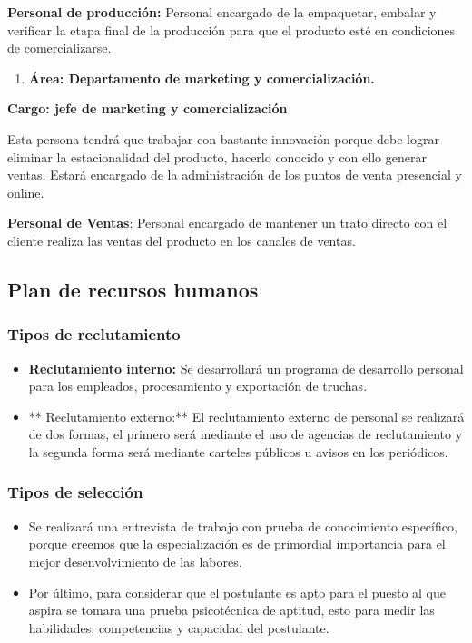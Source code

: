 \documentclass[
  stu,
  floatsintext,
  longtable,
  a4paper,
  nolmodern,
  notxfonts,
  notimes,
  12pt,
  colorlinks=true,linkcolor=blue,citecolor=blue,urlcolor=blue]{apa7}
\providecommand{\tightlist}{%
  \setlength{\itemsep}{0pt}\setlength{\parskip}{0pt}}
\begin{document}
\textbf{Personal de producción:} Personal encargado de la empaquetar,
embalar y verificar la etapa final de la producción para que el producto
esté en condiciones de comercializarse.

\begin{enumerate}
\def\labelenumi{\alph{enumi})}
\setcounter{enumi}{3}
\tightlist
\item
  \textbf{Área: Departamento de marketing y comercialización.}
\end{enumerate}

\textbf{Cargo: jefe de marketing y comercialización}

Esta persona tendrá que trabajar con bastante innovación porque debe
lograr eliminar la estacionalidad del producto, hacerlo conocido y con
ello generar ventas. Estará encargado de la administración de los puntos
de venta presencial y online.

\textbf{Personal de Ventas}: Personal encargado de mantener un trato
directo con el cliente realiza las ventas del producto en los canales de
ventas.

\subsection{Plan de recursos humanos}\label{plan-de-recursos-humanos}

\subsubsection{Tipos de reclutamiento}\label{tipos-de-reclutamiento}

\begin{itemize}
\tightlist
\item
  \textbf{Reclutamiento interno:} Se desarrollará un programa de
  desarrollo personal para los empleados, procesamiento y exportación de
  truchas.
\item
  ** Reclutamiento externo:** El reclutamiento externo de personal se
  realizará de dos formas, el primero será mediante el uso de agencias
  de reclutamiento y la segunda forma será mediante carteles públicos u
  avisos en los periódicos.
\end{itemize}

\subsubsection{Tipos de selección}\label{tipos-de-selecciuxf3n}

\begin{itemize}
\tightlist
\item
  Se realizará una entrevista de trabajo con prueba de conocimiento
  específico, porque creemos que la especialización es de primordial
  importancia para el mejor desenvolvimiento de las labores.
\item
  Por último, para considerar que el postulante es apto para el puesto
  al que aspira se tomara una prueba psicotécnica de aptitud, esto para
  medir las habilidades, competencias y capacidad del postulante.
\end{itemize}
\end{document}
